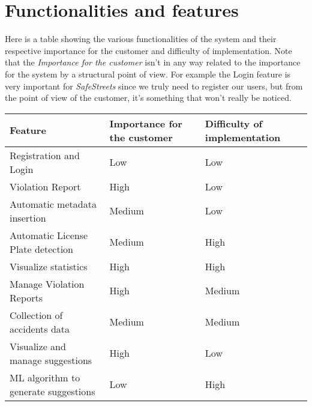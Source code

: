 \section{Functionalities and features}
Here is a table showing the various functionalities of the system and their
respective importance for the customer and difficulty of implementation. Note
that the \emph{Importance for the customer} isn't in any way related to the
importance for the system by a structural point of view. For example the Login
feature is very important for \emph{SafeStreets} since we truly need to register
our users, but from the point of view of the customer, it's something that won't
really be noticed.

\begin{table}[ht]
    \sffamily
    \begin{tabu} to \linewidth {X[2,l,m] X[1,c,m] X[1,c,m]}
    \toprule
    \rowfont{\bfseries}
    Feature & Importance for the customer & Difficulty of implementation \\
    \midrule
    Registration and Login & Low & Low \\ 
    Violation Report & High & Low \\ 
    Automatic metadata insertion & Medium & Low \\ 
    Automatic License Plate detection & Medium & High \\ 
    Visualize statistics & High & High \\ 
    Manage Violation Reports & High & Medium \\ 
    Collection of accidents data & Medium & Medium \\ 
    Visualize and manage suggestions & High & Low \\ 
    ML algorithm to generate suggestions & Low & High \\
    \bottomrule
    \end{tabu}
\end{table}


